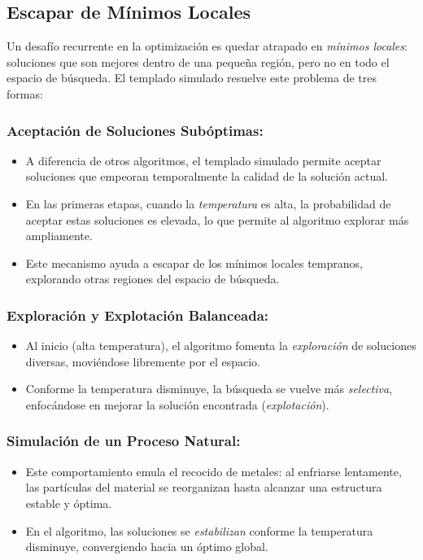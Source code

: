 \documentclass{article}
\begin{document}
\subsection{Escapar de Mínimos Locales}

Un desafío recurrente en la optimización es quedar atrapado en \textit{mínimos locales}: soluciones que son mejores dentro de una pequeña región, pero no en todo el espacio de búsqueda. El templado simulado resuelve este problema de tres formas:

\subsubsection{Aceptación de Soluciones Subóptimas:}
\begin{itemize}
    \item A diferencia de otros algoritmos, el templado simulado permite aceptar soluciones que empeoran temporalmente la calidad de la solución actual.
    \item En las primeras etapas, cuando la \textit{temperatura} es alta, la probabilidad de aceptar estas soluciones es elevada, lo que permite al algoritmo explorar más ampliamente.
    \item Este mecanismo ayuda a escapar de los mínimos locales tempranos, explorando otras regiones del espacio de búsqueda.
\end{itemize}

\subsubsection{Exploración y Explotación Balanceada:}
\begin{itemize}
    \item Al inicio (alta temperatura), el algoritmo fomenta la \textit{exploración} de soluciones diversas, moviéndose libremente por el espacio.
    \item Conforme la temperatura disminuye, la búsqueda se vuelve más \textit{selectiva}, enfocándose en mejorar la solución encontrada (\textit{explotación}).
\end{itemize}

\subsubsection{Simulación de un Proceso Natural:}
\begin{itemize}
    \item Este comportamiento emula el recocido de metales: al enfriarse lentamente, las partículas del material se reorganizan hasta alcanzar una estructura estable y óptima.
    \item En el algoritmo, las soluciones se \textit{estabilizan} conforme la temperatura disminuye, convergiendo hacia un óptimo global.
\end{itemize}
\end{document}

